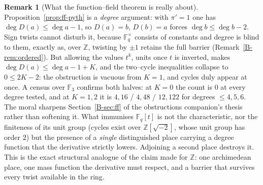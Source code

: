 \documentclass[11pt]{article}
\theoremstyle{definition}
\newtheorem{remark}[theorem]{Remark}
\begin{document}
\begin{remark}[What the function--field theorem is really about]\label{rem:ffplaces}
Proposition~\ref{prop:ff-pyth} is a \emph{degree} argument: with $\pi'=1$ one has
$\deg D(a)\le\deg a-1$, so $D(a)=b$, $D(b)=a$ forces $\deg b\le\deg b-2$. Sign twists cannot
disturb it, because $\mathbb{F}_q^\times$ consists of constants and degree is blind to them,
exactly as, over $\mathbb{Z}$, twisting by $\pm1$ retains the full barrier
(Remark~\ref{B-rem:ordered}). But allowing the values $t^{k}$, units once $t$ is inverted, makes
$\deg D(a)\le\deg a-1+K$, and the two--cycle inequalities collapse to $0\le2K-2$: the obstruction
is vacuous from $K=1$, and cycles duly appear at once. A census over $\mathbb{F}_3$ confirms both
halves: at $K=0$ the count is $0$ at every degree tested, and at $K=1,2$ it is
$4,16$ / $4,48$ / $12,122$ for degrees $\le4,5,6$.
The moral sharpens Section~\ref{B-sec:ff} of the obstructions companion's thesis rather than softening it. What immunises
$\mathbb{F}_q[t]$ is not the characteristic, nor the finiteness of its unit group (cycles exist
over $\mathbb{Z}[\sqrt{-2}]$, whose unit group has order $2$) but the presence of a
\emph{single} distinguished place carrying a degree function that the derivative strictly lowers.
Adjoining a second place destroys it. This is the exact structural analogue of the claim made for
$\mathbb{Z}$: one archimedean place, one mass function the derivative must respect, and a barrier
that survives every twist available in the ring.
\end{remark}
\end{document}
